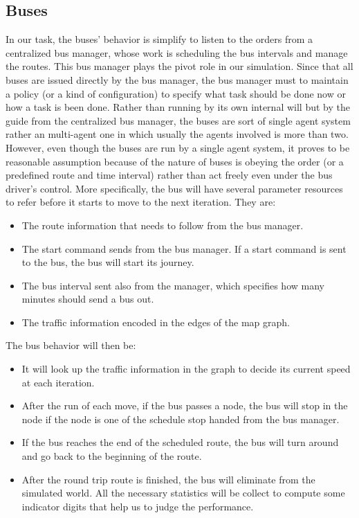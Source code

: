 \documentclass{sig-alternate}
\begin{document}
\subsection{Buses}
In our task, the buses' behavior is simplify to listen to the orders from a centralized bus manager, whose work is scheduling the bus intervals and manage the routes. 
This bus manager plays the pivot role in our simulation. 
Since that all buses are issued directly by the bus manager, the bus manager must to maintain a policy (or a kind of configuration) to specify what task should be done now or how a task is been done.
Rather than running by its own internal will but by the guide from the centralized bus manager, the buses are sort of single agent system rather an multi-agent one in which usually the agents involved is more than two. 
However, even though the buses are run by a single agent system, it proves to be reasonable assumption because of the nature of buses is obeying the order (or a predefined route and time interval) rather than act freely even under the bus driver's control.
More specifically, the bus will have several parameter resources to refer before it starts to move to the next iteration. 
They are: 
\begin{itemize}
\item The route information that needs to follow from the bus manager. 
\item The start command sends from the bus manager. If a start command is sent to the bus, the bus will start its journey.
\item The bus interval sent also from the manager, which specifies how many minutes should send a bus out.
\item The traffic information encoded in the edges of the map graph.
\end{itemize}
The bus behavior will then be:
\begin{itemize}
\item It will look up the traffic information in the graph to decide its current speed at each iteration.
\item After the run of each move, if the bus passes a node, the bus will stop in the node if the node is one of the schedule stop handed from the bus manager.
\item If the bus reaches the end of the scheduled route, the bus will turn around and go back to the beginning of the route.
\item After the round trip route is finished, the bus will eliminate from the simulated world. All the necessary statistics will be collect to compute some indicator digits that help us to judge the performance.
\end{itemize}
\end{document}
